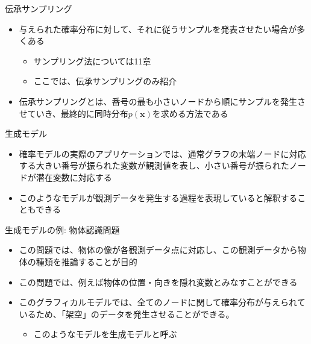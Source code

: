 \begin{frame}{伝承サンプリング}
 \begin{itemize}
  \item 与えられた確率分布に対して、それに従うサンプルを発表させたい場合が多くある
        \begin{itemize}
         \item サンプリング法については11章
         \item ここでは、伝承サンプリングのみ紹介
        \end{itemize}
  \item 伝承サンプリングとは、番号の最も小さいノードから順にサンプルを発生させていき、最終的に同時分布$p(\bm{x})$を求める方法である
 \end{itemize}
\end{frame}

\begin{frame}{生成モデル}
 \begin{itemize}
  \item 確率モデルの実際のアプリケーションでは、通常グラフの末端ノードに対応する大きい番号が振られた変数が観測値を表し、小さい番号が振られたノードが潜在変数に対応する
  \item このようなモデルが観測データを発生する過程を表現していると解釈することもできる
 \end{itemize}
\end{frame}

\begin{frame}{生成モデルの例: 物体認識問題}
 \begin{itemize}
  \item この問題では、物体の像が各観測データ点に対応し、この観測データから物体の種類を推論することが目的
  \item この問題では、例えば物体の位置・向きを隠れ変数とみなすことができる
  \item このグラフィカルモデルでは、全てのノードに関して確率分布が与えられているため、「架空」のデータを発生させることができる。
        \begin{itemize}
         \item このようなモデルを\alert{生成モデル}と呼ぶ
        \end{itemize}
 \end{itemize}
\end{frame}
